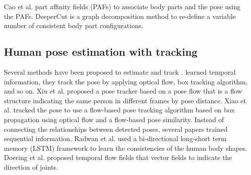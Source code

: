 \documentclass[conference]{IEEEtran}
\begin{document}
Cao et al. \cite{cao2017realtime}  part affinity fields (PAFs) to associate body parts and  the pose using the PAFs.
 DeeperCut \cite{deepcut16cvpr} is a graph decomposition method to re-define a variable number of consistent body part configurations.




\subsection{Human pose estimation with tracking}
Several methods have been proposed to estimate and track  \cite{doering2018joint, girdhar2018detecttrack, insafutdinov17arttrack, Iqbal_CVPR2017, jin2017towards, xiao2018simple, xiu2018pose}. 
 learned temporal information, they track the pose by applying optical flow, box tracking algorithm, and so on. Xiu et al. \cite{xiu2018pose} proposed a pose tracker based on a pose flow that is a flow structure indicating the same person in different frames by pose distance. Xiao et al. \cite{xiao2018simple} tracked the pose to use a flow-based pose tracking algorithm based on box propagation using optical flow and a flow-based pose similarity. 
Instead of  connecting the relationships between detected poses, several papers trained sequential information. Radwan et al. \cite{MPR} used a bi-directional long-short term memory (LSTM) framework to learn the consistencies of the human body shapes. Doering et al. \cite{doering2018joint} proposed temporal flow fields that  vector fields to indicate the direction of joints. 

\end{document}
